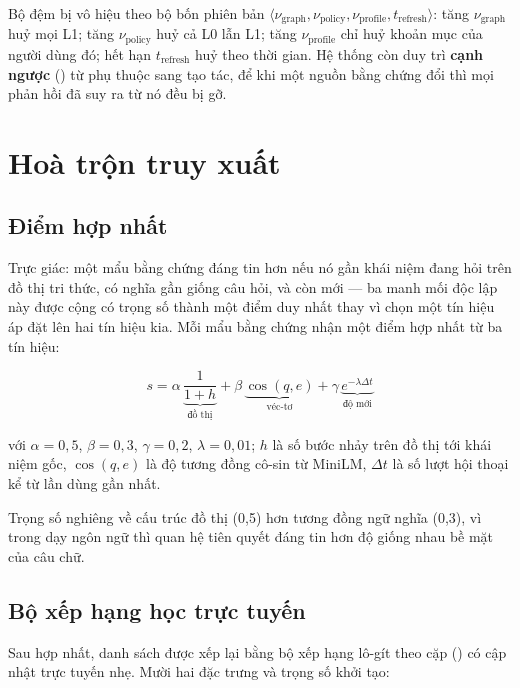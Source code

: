 Bộ đệm bị vô hiệu theo bộ bốn phiên bản
\(\langle \nu_{\text{graph}}, \nu_{\text{policy}}, \nu_{\text{profile}}, t_{\text{refresh}} \rangle\):
tăng \(\nu_{\text{graph}}\) huỷ mọi  L1; tăng \(\nu_{\text{policy}}\) huỷ cả L0
lẫn L1; tăng \(\nu_{\text{profile}}\) chỉ huỷ khoản mục của người dùng đó; hết hạn
\(t_{\text{refresh}}\) huỷ theo thời gian. Hệ thống còn duy trì \textbf{cạnh ngược}
() từ phụ thuộc sang tạo tác, để khi một nguồn bằng chứng đổi thì mọi
phản hồi đã suy ra từ nó đều bị gỡ.

\section{Hoà trộn truy xuất}

\subsection{Điểm hợp nhất}

Trực giác: một mẩu bằng chứng đáng tin hơn nếu nó gần khái niệm đang hỏi trên đồ thị tri
thức, có nghĩa gần giống câu hỏi, và còn mới — ba manh mối độc lập này được cộng có
trọng số thành một điểm duy nhất thay vì chọn một tín hiệu áp đặt lên hai tín hiệu kia.
Mỗi mẩu bằng chứng nhận một điểm hợp nhất từ ba tín hiệu:

\begin{equation}
s = \alpha\,\underbrace{\frac{1}{1+h}}_{\text{đồ thị}} + \beta\,\underbrace{\cos(q, e)}_{\text{véc-tơ}} + \gamma\,\underbrace{e^{-\lambda \Delta t}}_{\text{độ mới}}
\end{equation}

với \(\alpha = 0{,}5\), \(\beta = 0{,}3\), \(\gamma = 0{,}2\), \(\lambda = 0{,}01\);
\(h\) là số bước nhảy trên đồ thị tới khái niệm gốc, \(\cos(q,e)\) là độ tương đồng cô-sin
từ MiniLM, \(\Delta t\) là số lượt hội thoại kể từ lần dùng gần nhất.

Trọng số nghiêng về cấu trúc đồ thị (0,5) hơn tương đồng ngữ nghĩa (0,3), vì trong dạy
ngôn ngữ thì quan hệ tiên quyết đáng tin hơn độ giống nhau bề mặt của câu chữ.

\subsection{Bộ xếp hạng học trực tuyến}

Sau hợp nhất, danh sách được xếp lại bằng bộ xếp hạng lô-gít theo cặp
() có cập nhật trực tuyến nhẹ. Mười hai đặc trưng và trọng số
khởi tạo:

